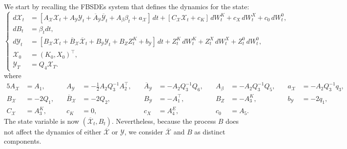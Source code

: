 \documentclass[10pt,a4paper]{amsart}
\numberwithin{equation}{section}
\renewcommand{\bar}{\overline}
\begin{document}
We start by recalling the FBSDEs system that defines the dynamics for the state: 
\begin{equation}
\label{eqn: fbsde mf repr company}
\begin{cases}
d\mathcal{X}_t 
    &= [A_{\mathcal{X}} \mathcal{X}_t + A_{\mathcal{Y}} \mathcal{Y}_t + \overline{A}_{\mathcal{Y}} \overline{{\mathcal{Y}}}_t + A_\beta \beta_t + a_\mathcal{X}]\, dt + [C_{\mathcal{X}} \mathcal{X}_t + c_K]\,dW_t^{K} +c_X\,dW_t^{X} + c_0\,dW_t^{0}, \\
    dB_t &= \beta_t dt,\\
    d{\mathcal{Y}}_t &= [B_{\mathcal{X}} \mathcal{X}_t + \overline{B}_{\mathcal{X}} \overline{{\mathcal{X}}}_t + B_{\mathcal{Y}} {\mathcal{Y}}_t + B_Z {Z}^K_t + b_\mathcal{Y}]\,dt  + {Z}^K_t\,d{W}_t^{K} + {Z}^X_t\,dW_t^{X}+ {Z}^0_t\,dW_t^{0},\\
    {\mathcal{X}}_0 &= (K_0,X_0)^\top,\\
    {\mathcal{Y}}_T &= Q_4{\mathcal{X}}_T.
\end{cases}
\end{equation}
where
\begin{alignat*}{5}
    A_{\mathcal{X}} &= A_1, &\quad
    A_{\mathcal{Y}} &= -\tfrac{1}{2}A_2 Q_3^{-1} A_2^\top, &\quad
    \overline{A}_{\mathcal{Y}} &= -A_2Q_3^{-1}Q_6, &\quad
    A_\beta &= -A_2Q_3^{-1}Q_5, &\quad
    a_{\mathcal{X}} &= -A_2 Q_3^{-1}q_3, \\[6pt]
    B_{\mathcal{X}} &= -2Q_1, &\quad
    \overline{B}_{\mathcal{X}} &= -2Q_2, &\quad
    B_{\mathcal{Y}} &= -A_1^\top, &\quad
    B_Z &= -A_3^K,&\quad
    b_{\mathcal{Y}} &= -2q_1, \\[6pt]
    C_{\mathcal{X}} &= A_3^K, &\quad
    c_K &= 0, &\quad
    c_X &= A_4^E, &\quad
    c_0 &= A_5.
\end{alignat*}
The state variable is now $(\bar{\mathcal{X}}_t, B_t)$. Nevertheless, because the process $B$ does not affect the dynamics of either $\bar{\mathcal{X}}$ or $\mathcal{Y}$, we consider $\bar{\mathcal{X}}$ and $B$ as distinct components.
\end{document}
